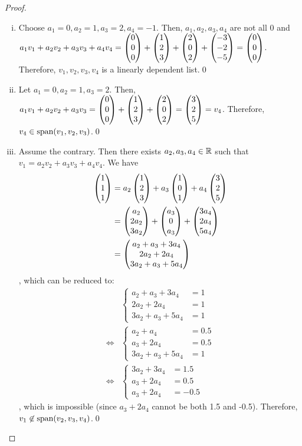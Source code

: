 \begin{proof}
    \renewcommand{\qedsymbol}{$ $}
    \begin{enumerate}[(i)]
        \renewcommand{\qedsymbol}{$\blacksquare$}
        \item Choose $a_1=0, a_2=1, a_3=2, a_4=-1$. Then, $a_1,a_2,a_3,a_4$ are not all 0 and $a_1v_1+a_2v_2+a_3v_3+a_4v_4=\begin{pmatrix} 0\\ 0\\ 0\end{pmatrix}+\begin{pmatrix} 1\\ 2\\ 3\end{pmatrix}+\begin{pmatrix} 2\\ 0\\ 2\end{pmatrix}+\begin{pmatrix} -3\\ -2\\ -5\end{pmatrix}=\begin{pmatrix} 0\\ 0\\ 0\end{pmatrix}$. Therefore, $v_1,v_2,v_3,v_4$ is a linearly dependent list.\qed
        \item Let $a_1=0, a_2=1, a_3=2$. Then, $a_1v_1+a_2v_2+a_3v_3=\begin{pmatrix} 0\\ 0\\ 0\end{pmatrix}+\begin{pmatrix} 1\\ 2\\ 3\end{pmatrix}+\begin{pmatrix} 2\\ 0\\ 2\end{pmatrix}=\begin{pmatrix} 3\\ 2\\ 5\end{pmatrix}=v_4$. Therefore, $v_4\in\textnormal{span}(v_1,v_2,v_3)$.\qed
        \item Assume the contrary. Then there exists $a_2,a_3,a_4\in\mathbb R$ such that $v_1=a_2v_2+a_3v_3+a_4v_4$. We have
              \[
                  \begin{aligned}
                      \begin{pmatrix} 1\\ 1\\ 1\end{pmatrix} & = a_2 \begin{pmatrix} 1\\ 2\\ 3\end{pmatrix}+a_3 \begin{pmatrix} 1\\ 0\\ 1\end{pmatrix}+a_4 \begin{pmatrix} 3\\ 2\\ 5\end{pmatrix}          \\
                                            & = \begin{pmatrix} a_2\\ 2a_2\\ 3a_2\end{pmatrix}+\begin{pmatrix} a_3\\ 0\\ a_3\end{pmatrix}+\begin{pmatrix} 3a_4\\ 2a_4\\ 5a_4\end{pmatrix} \\
                                            & = \begin{pmatrix} a_2+a_3+3a_4\\ 2a_2+2a_4\\ 3a_2+a_3+5a_4\end{pmatrix}
                  \end{aligned}
              \]
              , which can be reduced to:
              \begin{align*}
                   & \begin{cases}
                         a_2+a_3+3a_4  & = 1 \\
                         2a_2+2a_4     & = 1 \\
                         3a_2+a_3+5a_4 & = 1
                     \end{cases}   \\
                  \iff
                   & \begin{cases}
                         a_2+a_4       & = 0.5 \\
                         a_3+2a_4      & = 0.5 \\
                         3a_2+a_3+5a_4 & = 1
                     \end{cases} \\
                  \iff
                   & \begin{cases}
                         3a_2+3a_4 & = 1.5  \\
                         a_3+2a_4  & = 0.5  \\
                         a_3+2a_4  & = -0.5
                     \end{cases}
              \end{align*}
              , which is impossible (since $a_3+2a_4$ cannot be both 1.5 and -0.5). Therefore, $v_1\not\in\textnormal{span}{(v_2,v_3,v_4)}$.\qed
    \end{enumerate}
\end{proof}